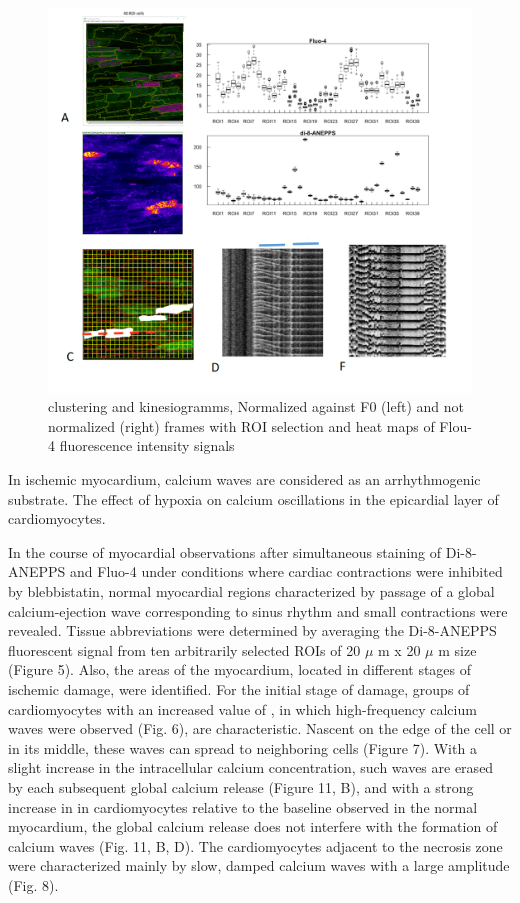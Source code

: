 \documentclass{biophys-new}
\begin{document}
\begin{figure}
    \includegraphics[width=0.8\linewidth]{fig3.png}
    \caption{clustering and kinesiogramms, Normalized against F0 (left) and not normalized (right) frames with ROI selection and heat maps of Flou-4 fluorescence intensity signals }
    \label{fig:fig3}
\end{figure}


In ischemic myocardium, calcium waves are considered as an arrhythmogenic substrate.
The effect of hypoxia on calcium oscillations in the epicardial layer of cardiomyocytes.


In the course of myocardial observations after simultaneous staining of Di-8-ANEPPS and Fluo-4 under conditions where cardiac contractions were inhibited by blebbistatin, normal myocardial regions characterized by passage of a global calcium-ejection wave corresponding to sinus rhythm and small contractions were revealed. Tissue abbreviations were determined by averaging the Di-8-ANEPPS fluorescent signal from ten arbitrarily selected ROIs of 20 $\mu$ m x 20 $\mu$ m size (Figure 5). Also, the areas of the myocardium, located in different stages of ischemic damage, were identified. For the initial stage of damage, groups of cardiomyocytes with an increased value of , in which high-frequency calcium waves were observed (Fig. 6), are characteristic. Nascent on the edge of the cell or in its middle, these waves can spread to neighboring cells (Figure 7). With a slight increase in the intracellular calcium concentration, such waves are erased by each subsequent global calcium release (Figure 11, B), and with a strong increase in  in cardiomyocytes relative to the baseline observed in the normal myocardium, the global calcium release does not interfere with the formation of calcium waves (Fig. 11, B, D). The cardiomyocytes adjacent to the necrosis zone were characterized mainly by slow, damped calcium waves with a large amplitude (Fig. 8).
\end{document}
